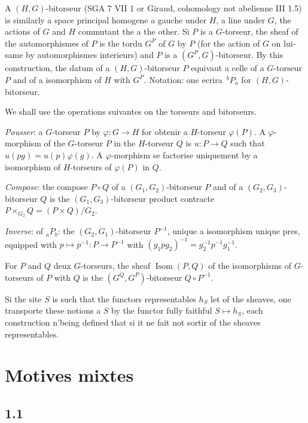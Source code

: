 \documentclass[12pt,a4paper]{article}
\theoremstyle{plain}
\theoremstyle{definition}
\theoremstyle{remark}
\DeclareMathOperator{\Isom}{Isom}
\begin{document}
A $(H,G)$-bitorseur (SGA 7 VII 1 or Giraud, cohomology not abelienne III 1.5) is
similarly a space principal homogene a gauche under $H$, a line under $G$, the actions
of $G$ and $H$ commutant the a the other. Si $P$ is a $G$-torseur, the sheaf of the
automorphismes of $P$ is the tordu $G^P$ of $G$ by $P$ (for the action of $G$ on lui-same
by automorphismes interieurs) and $P$ is a $(G^P, G)$-bitorseur. By this construction,
the datum of a $(H,G)$-bitorseur $P$ equivaut a celle of a $G$-torseur $P$ and of a
isomorphism of $H$ with $G^P$. Notation: one ecrira $\,^b\!P_a$ for $(H,G)$-bitorseur.

We shall use the operations suivantes on the torseurs and bitorseurs.

\emph{Pousser}: a $G$-torseur $P$ by $\varphi: G \to H$ for obtenir a $H$-torseur
$\varphi(P)$. A $\varphi$-morphism of the $G$-torseur $P$ in the $H$-torseur $Q$ is
$u: P \to Q$ such that $u(pg) = u(p)\varphi(g)$. A $\varphi$-morphism se factorise
uniquement by a isomorphism of $H$-torseurs of $\varphi(P)$ in $Q$.

\emph{Compose}: the compose $P \circ Q$ of a $(G_1, G_2)$-bitorseur $P$ and of a
$(G_2, G_3)$-bitorseur $Q$ is the $(G_1, G_3)$-bitorseur product contracte
$P \times_{G_2} Q = (P \times Q)/G_2$.

\emph{Inverse}: of $_a\!P_b$: the $(G_2, G_1)$-bitorseur $P^{-1}$, unique a isomorphism
unique pres, equipped with $p \mapsto p^{-1}: P \to P^{-1}$ with $(g_1 p g_2)^{-1} = g_2^{-1} p^{-1} g_1^{-1}$.

For $P$ and $Q$ deux $G$-torseurs, the sheaf $\Isom(P,Q)$ of the isomorphisms of
$G$-torseurs of $P$ with $Q$ is the $(G^Q, G^P)$-bitorseur $Q \circ P^{-1}$.

Si the site $S$ is such that the functors representables $h_S$ let of the sheaves,
one transporte these notions a $S$ by the functor fully faithful $S \mapsto h_S$,
each construction n'being defined that si it ne fait not sortir of the sheaves
representables.

\section{Motives mixtes}\label{sec:1}

\subsection*{1.1}
\end{document}
